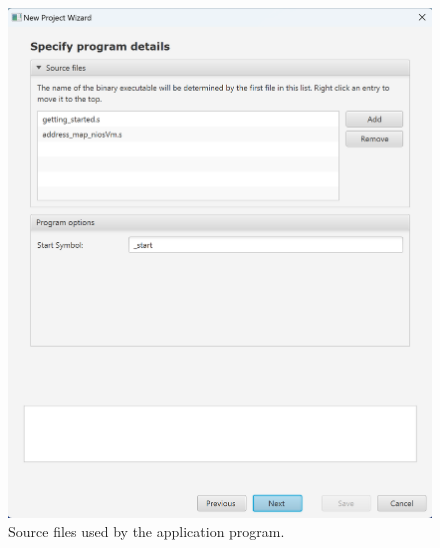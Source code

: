 \documentclass[epsfig,10pt,fullpage]{article}
\begin{document}
\begin{enumerate}
\begin{figure}[H]
	\begin{center}
	\includegraphics[scale=0.3]{figures/Snap5.png}
	\end{center}
	\caption{Source files used by the application program.}
\label{fig:MP5}
\end{figure}


\end{enumerate}
\end{document}
